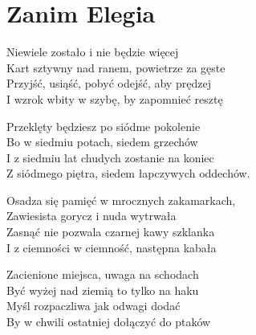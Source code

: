 \section{Zanim Elegia}
\begin{text}
Niewiele zostało i nie będzie więcej\\
Kart sztywny nad ranem, powietrze za gęste\\
Przyjść, usiąść, pobyć odejść, aby prędzej\\
I wzrok wbity w szybę, by zapomnieć resztę

Przeklęty będziesz po siódme pokolenie\\
Bo w siedmiu potach, siedem grzechów\\
I z siedmiu lat chudych zostanie na koniec\\
Z siódmego piętra, siedem łapczywych oddechów.

Osadza się pamięć w mrocznych zakamarkach,\\
Zawiesista gorycz i nuda wytrwała\\
Zasnąć nie pozwala czarnej kawy szklanka\\
I z ciemności w ciemność, następna kabała

Zacienione miejsca, uwaga na schodach\\
Być wyżej nad ziemią to tylko na haku\\
Myśl rozpaczliwa jak odwagi dodać\\
By w chwili ostatniej dołączyć do ptaków
\end{text}